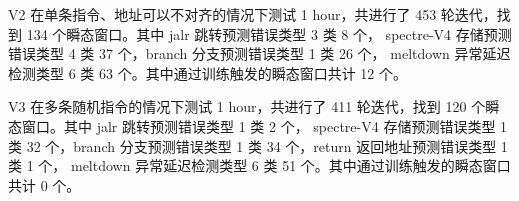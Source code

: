 V2 在单条指令、地址可以不对齐的情况下测试 1 hour，共进行了 453 轮迭代，找到 134 个瞬态窗口。其中 jalr 跳转预测错误类型 3 类 8 个，
spectre-V4 存储预测错误类型 4 类 37 个，branch 分支预测错误类型 1 类 26 个，
meltdown 异常延迟检测类型 6 类 63 个。其中通过训练触发的瞬态窗口共计 12 个。\par

\begin{table}[h!]
    \begin{center} 
    \caption{V2 瞬态窗口统计} 
    \label{table:v2-trans}  
    \end{center}
\end{table}

V3 在多条随机指令的情况下测试 1 hour，共进行了 411 轮迭代，找到 120 个瞬态窗口。其中 jalr 跳转预测错误类型 1 类 2 个，
spectre-V4 存储预测错误类型 1 类 32 个，branch 分支预测错误类型 1 类 34 个，return 返回地址预测错误类型 1 类 1 个，
meltdown 异常延迟检测类型 6 类 51 个。其中通过训练触发的瞬态窗口共计 0 个。\par

